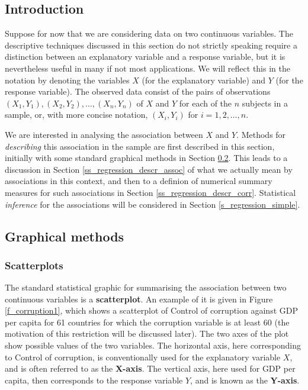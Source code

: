\subsection{Introduction}
\label{ss_regression_descr_intro}

Suppose for now that we are considering data on two continuous
variables. The descriptive techniques discussed in this section do not strictly
speaking require a distinction between an explanatory variable and a
response variable, but it is nevertheless useful in many if not most
applications. We will reflect this in the notation by denoting the
variables $X$ (for the explanatory variable) and $Y$ (for the
response variable). The observed data consist of the pairs of
observations $(X_{1}, Y_{1}), (X_{2}, Y_{2}), \dots, (X_{n}, Y_{n})$ of
$X$ and $Y$ for each of the $n$ subjects in a sample, or, with more
concise notation, $(X_{i}, Y_{i})$ for $i=1,2,\dots,n$.

We are interested in analysing the association between $X$ and $Y$.
Methods for \emph{describing} this association in the
sample are first described in this section, initially with some standard graphical
methods in Section \ref{ss_regression_descr_plots}. This leads to a
discussion in Section \ref{ss_regression_descr_assoc} of what we
actually mean by associations in this context, and then to a definion of
numerical summary measures for such associations in Section
\ref{ss_regression_descr_corr}. Statistical \emph{inference} for the
associations will be considered in Section \ref{s_regression_simple}.

\subsection{Graphical methods}
\label{ss_regression_descr_plots}

\subsubsection{Scatterplots}

The standard statistical graphic for summarising the association between
two continuous variables is a \textbf{scatterplot}. An example of it is
given in Figure \ref{f_corruption1}, which shows a scatterplot of
Control of corruption against GDP per capita for 61 countries for which
the corruption variable is at least 60 (the motivation of this
restriction will be discussed later). The two axes of the plot show
possible values of the two variables. The horizontal axis, here
corresponding to Control of corruption, is conventionally used for the
explanatory variable $X$, and is often referred to as the
\textbf{X-axis}. The vertical axis, here used for GDP per capita, then
corresponds to the response variable $Y$, and is known as the
\textbf{Y-axis}.

